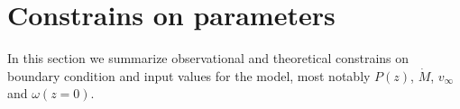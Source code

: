 \section{Constrains on parameters}
In this section we summarize observational and theoretical constrains on boundary condition and input values for the model, most notably $P(z)$, $\dot M$, $v_\infty$ and $\omega(z=0)$.